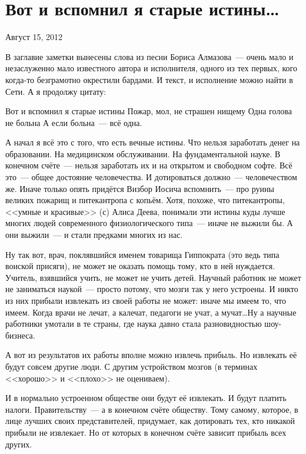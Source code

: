 \section{Вот и вспомнил я старые истины\dots}
\begin{timeline}Август 15, 2012\end{timeline}

В заглавие заметки вынесены слова из песни Бориса Алмазова~--- очень мало и незаслуженно мало известного автора и исполнителя, одного из тех первых, кого когда-то безграмотно окрестили бардами. И текст, и исполнение можно найти в Сети.  А я продолжу цитату:

\begin{shadequote}{}Вот и вспомнил я старые истины Пожар, мол, не страшен нищему Одна голова не больна А если больна~--- всё одна.\end{shadequote}

А начал я всё это с того, что есть вечные истины. Что нельзя заработать денег на образовании. На медицинском обслуживании. На фундаментальной науке. В конечном счёте~--- нельзя заработать их и на открытом и свободном софте.  Всё это~--- общее достояние человечества. И дотироваться должно~--- человечеством же. Иначе только опять придётся Визбор Иосича вспомнить~--- про руины великих пожарищ и питекантропа с копьём.  Хотя, похоже, что питекантропы, <<умные и красивые>> (с) Алиса Деева, понимали эти истины куды лучше многих людей современного физиологического типа~--- иначе не выжили бы. А они выжили~--- и стали предками многих из нас.

Ну так вот, врач, поклявшийся именем товарища Гиппократа (это ведь типа воиской присяги), не может не оказать помощь тому, кто в ней нуждается. Учитель, взявшийся учить, не может не учить детей. Научный работник не может не заниматься наукой~--- просто потому, что мозги так у него устроены. И никто из них прибыли извлекать из своей работы не может: иначе мы имеем то, что имеем. Когда врачи не лечат, а калечат, педагоги не учат, а мучат\dots Ну а научные работники умотали в те страны, где наука давно стала разновидностью шоу-бизнеса.

А вот из результатов их работы вполне можно извлечь прибыль. Но извлекать её будут совсем другие люди. С другим устройством мозгов (в терминах <<хорошо>> и <<плохо>> не оцениваем).

И в нормально устроенном обществе они будут её извлекать. И будут платить налоги. Правительству~--- а в конечном счёте обществу. Тому самому, которое, в лице лучших своих представителей, придумает, как дотировать тех, кто никакой прибыли не извлекает. Но от которых в конечном счёте зависит прибыль всех других.

